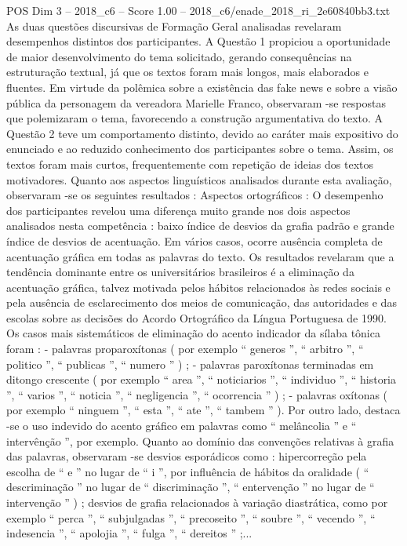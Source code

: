 \begin{textsample}{POS Dim 3 – 2018\_c6 – Score 1.00 – 2018\_c6/enade\_2018\_ri\_2e60840bb3.txt}
As duas questões discursivas de Formação Geral analisadas revelaram desempenhos distintos dos participantes.
A Questão 1 propiciou a oportunidade de maior desenvolvimento do tema solicitado, gerando consequências na estruturação textual, já que os textos foram mais longos, mais elaborados e fluentes.
Em virtude da polêmica sobre a existência das fake news e sobre a visão pública da personagem da vereadora Marielle Franco, observaram -se respostas que polemizaram o tema, favorecendo a construção argumentativa do texto.
A Questão 2 teve um comportamento distinto, devido ao caráter mais expositivo do enunciado e ao reduzido conhecimento dos participantes sobre o tema.
Assim, os textos foram mais curtos, frequentemente com repetição de ideias dos textos motivadores.
Quanto aos aspectos linguísticos analisados durante esta avaliação, observaram -se os seguintes resultados : Aspectos ortográficos : O desempenho dos participantes revelou uma diferença muito grande nos dois aspectos analisados nesta competência : baixo índice de desvios da grafia padrão e grande índice de desvios de acentuação.
Em vários casos, ocorre ausência completa de acentuação gráfica em todas as palavras do texto.
Os resultados revelaram que a tendência dominante entre os universitários brasileiros é a eliminação da acentuação gráfica, talvez motivada pelos hábitos relacionados às redes sociais e pela ausência de esclarecimento dos meios de comunicação, das autoridades e das escolas sobre as decisões do Acordo Ortográfico da Língua Portuguesa de 1990.
Os casos mais sistemáticos de eliminação do acento indicador da sílaba tônica foram : - palavras proparoxítonas ( por exemplo “ generos ”, “ arbitro ”, “ politico ”, “ publicas ”, “ numero ” ) ; - palavras paroxítonas terminadas em ditongo crescente ( por exemplo “ area ”, “ noticiarios ”, “ individuo ”, “ historia ”, “ varios ”, “ noticia ”, “ negligencia ”, “ ocorrencia ” ) ; - palavras oxítonas ( por exemplo “ ninguem ”, “ esta ”, “ ate ”, “ tambem ” ).
Por outro lado, destaca -se o uso indevido do acento gráfico em palavras como “ melâncolia ” e “ intervênção ”, por exemplo.
Quanto ao domínio das convenções relativas à grafia das palavras, observaram -se desvios esporádicos como : hipercorreção pela escolha de “ e ” no lugar de “ i ”, por influência de hábitos da oralidade ( “ descriminação ” no lugar de “ discriminação ”, “ entervenção ” no lugar de “ intervenção ” ) ; desvios de grafia relacionados à variação diastrática, como por exemplo “ perca ”, “ subjulgadas ”, “ precoseito ”, “ soubre ”, “ vecendo ”, “ indesencia ”, “ apolojia ”, “ fulga ”, “ dereitos ” ;...

\end{textsample}
